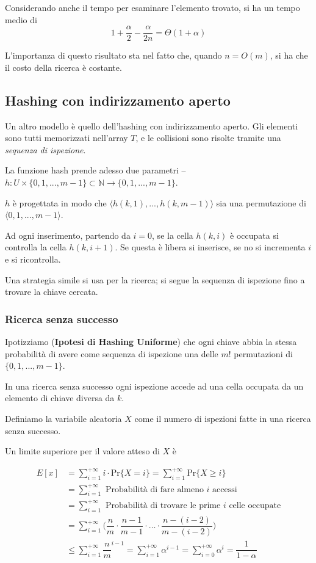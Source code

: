 \documentclass[a4paper,10pt]{article}
\theoremstyle{definition}
\newcommand{\naturals}{\mathbb{N}}
\begin{document}
Considerando anche il tempo per esaminare l'elemento trovato, si ha un tempo medio di \[1 +\dfrac{\alpha}{2} - \dfrac{\alpha}{2n}  = \Theta(1+\alpha)\]

L'importanza di questo risultato sta nel fatto che, quando $n = O(m)$, si ha che il costo della ricerca è costante.
\newpage
\subsection{Hashing con indirizzamento aperto}
Un altro modello è quello dell'hashing con indirizzamento aperto. Gli elementi sono tutti memorizzati nell'array $T$, e le collisioni sono risolte tramite una \emph{sequenza di ispezione}.

La funzione hash prende adesso due parametri -- $h : U \times \{0, 1, ..., m-1\} \subset \naturals \to \{0, 1, ..., m-1\}$.\smallskip

$h$ è progettata in modo che $\langle h(k, 1), ..., h(k, m-1)\rangle$ sia una permutazione di $\langle 0,1, ..., m-1 \rangle$.\bigskip

Ad ogni inserimento, partendo da $i = 0$, se la cella $h(k, i)$ è occupata si controlla la cella $h(k, i+1)$. Se questa è libera si inserisce, se no si incrementa $i$ e si ricontrolla.

Una strategia simile si usa per la ricerca; si segue la sequenza di ispezione fino a trovare la chiave cercata.

\subsubsection{Ricerca senza successo}
Ipotizziamo (\textbf{Ipotesi di Hashing Uniforme}) che ogni chiave abbia la stessa probabilità di avere come sequenza di ispezione una delle $m!$ permutazioni di $\{0, 1, ..., m-1\}$.\bigskip

In una ricerca senza successo ogni ispezione accede ad una cella occupata da un elemento di chiave diversa da $k$.\smallskip

Definiamo la variabile aleatoria $X$ come il numero di ispezioni fatte in una ricerca senza successo.

Un limite superiore per il valore atteso di $X$ è 

\[\begin{aligned}
E[x] &= \sum\limits_{i = 1}^{+\infty}i \cdot\text{Pr}\{X=i\} = \sum\limits_{i = 1}^{+\infty}\text{Pr}\{X\geq i\}\\
&= \sum_{i = 1}^{+\infty}\text{ Probabilità di fare almeno $i$ accessi}\\
&= \sum_{i = 1}^{+\infty}\text{ Probabilità di trovare le prime $i$ celle occupate}\\
&= \sum_{i = 1}^{+\infty}\bigg(\dfrac{n}{m}\cdot \dfrac{n-1}{m-1}\cdot\hdots\cdot\dfrac{n-(i-2)}{m-(i-2)}\bigg)\\
&\leq \sum_{i = 1}^{+\infty} \dfrac{n}{m}^{i-1} = \sum_{i = 1}^{+\infty}\alpha^{i-1} = \sum_{i = 0}^{+\infty} \alpha^i = \dfrac{1}{1-\alpha}
  \end{aligned}\]
  
\end{document}
